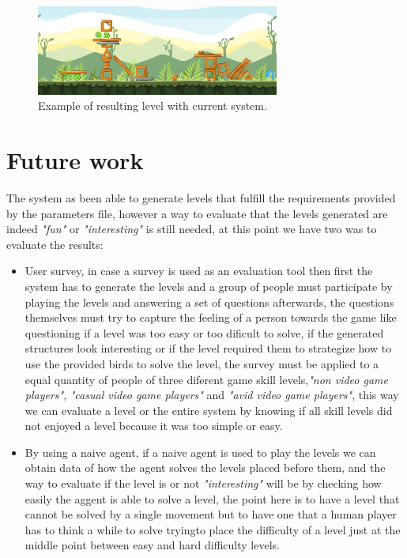 \documentclass[conference]{IEEEtran}
\begin{document}
\begin{figure}[htbp]
    \centerline{\includegraphics[width=80mm]{Images/Result_n2.png}}
    \caption{Example of resulting level with current system.}
    \label{result_1}
\end{figure}

\section{Future work}

The system as been able to generate levels that fulfill the requirements provided by the parameters file, however a way to evaluate that the levels generated are indeed \textit{"fun"}
 or \textit{"interesting"} is still needed, at this point we have two was to evaluate the results:
 \begin{itemize}
    \item User survey, in case a survey is used as an evaluation tool then first the system has to generate the levels and a group of people must participate by playing the levels and answering a set of questions afterwards, the questions themselves must try to capture the feeling of a person towards the game like questioning if a level was too easy or too dificult to solve, if the generated structures look interesting or if the level required them to strategize how to use the provided birds to solve the level, the survey must be applied to a equal quantity of people of three diferent game skill levels,\textit{"non video game players"}, \textit{"casual video game players"} and \textit{"avid video game players"}, this way we can evaluate a level or the entire system by knowing if all skill levels did not enjoyed a level because it was too simple or easy.
    \item By using a naive agent, if a naive agent is used to play the levels we can obtain data of how the agent solves the levels placed before them, and the way to evaluate if the level is or not \textit{"interesting"} will be by checking how easily the aggent is able to solve a level, the point here is to have a level that cannot be solved by a single movement but to have one that a human player has to think a while to solve tryingto place the difficulty of a level just at the middle point between easy and hard difficulty levels.
\end{itemize}
\end{document}
